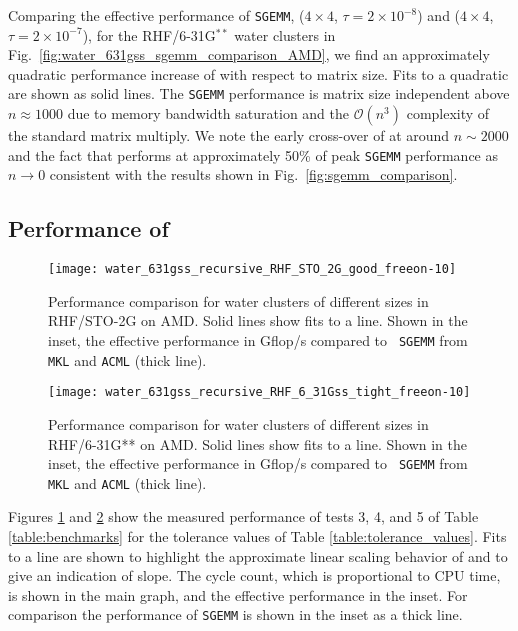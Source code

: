 Comparing the effective performance of {\tt SGEMM}, \SpAMM{}($4 \times 4$,
$\tau = 2 \times 10^{-8}$) and \SpAMM{}($4 \times 4$, $\tau = 2 \times
10^{-7}$), for the RHF/6-31G${}^{**}$ water clusters in
Fig.~\ref{fig:water_631gss_sgemm_comparison_AMD}, we find an approximately
quadratic performance increase of \SpAMM{} with respect to matrix size. Fits to
a quadratic are shown as solid lines. The {\tt SGEMM} performance is matrix
size independent above $n \approx 1000$ due to memory bandwidth saturation and
the $\mathcal{O} \left( n^{3} \right)$ complexity of the standard matrix
multiply. We note the early cross-over of \SpAMM{} at around $n \sim 2000$ and
the fact that \SpAMM{} performs at approximately 50\% of peak {\tt SGEMM}
performance as $n \rightarrow 0$ consistent with the results shown in
Fig.~\ref{fig:sgemm_comparison}.

\subsection{Performance of \SpAMM{}}

\begin{figure}
\texttt{[image: water\_631gss\_recursive\_RHF\_STO\_2G\_good\_freeon-10]}
\caption{\label{fig:water_STO2G_AMD} Performance comparison for water clusters
of different sizes in RHF/STO-2G on AMD. Solid lines show fits to a line.
Shown in the inset, the effective performance in Gflop/s compared to {\tt
SGEMM} from {\tt MKL} and {\tt ACML} (thick line).}
\end{figure}

\begin{figure}
\texttt{[image: water\_631gss\_recursive\_RHF\_6\_31Gss\_tight\_freeon-10]}
\caption{\label{fig:water_631gss_AMD} Performance comparison for water clusters
of different sizes in RHF/6-31G** on AMD. Solid lines show fits to a line.
Shown in the inset, the effective performance in Gflop/s compared to {\tt
SGEMM} from {\tt MKL} and {\tt ACML} (thick line).}
\end{figure}

Figures \ref{fig:water_STO2G_AMD} and \ref{fig:water_631gss_AMD} show the
measured performance of tests 3, 4, and 5 of Table \ref{table:benchmarks} for
the tolerance values of Table \ref{table:tolerance_values}. Fits to a line are
shown to highlight the approximate linear scaling behavior of \SpAMM{} and to
give an indication of slope. The cycle count, which is proportional to CPU
time, is shown in the main graph, and the effective performance in the inset.
For comparison the performance of {\tt SGEMM} is shown in the inset as a thick
line.

